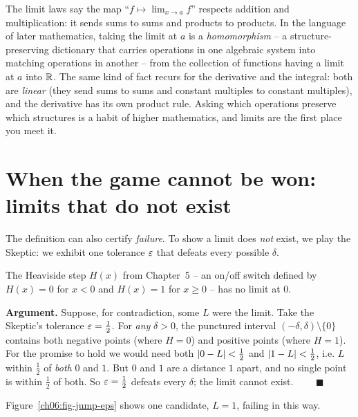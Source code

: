 \begin{connectionbox}
The limit laws say the map ``$f \mapsto \lim_{x\to a}f$'' respects addition and
multiplication: it sends sums to sums and products to products. In the language
of later mathematics, taking the limit at $a$ is a \emph{homomorphism} -- a
structure-preserving dictionary that carries operations in one algebraic system
into matching operations in another -- from the collection of functions having a
limit at $a$ into $\mathbb{R}$. The same kind of fact recurs for the derivative and the
integral: both are \emph{linear} (they send sums to sums and constant multiples
to constant multiples), and the derivative has its own product rule. Asking
which operations preserve which structures is a habit of higher mathematics,
and limits are the first place you meet it.
\end{connectionbox}

\section{When the game cannot be won: limits that do not exist}
\label{ch06:no-limit}

The definition can also certify \emph{failure}. To show a
limit does \emph{not} exist, we play the Skeptic: we exhibit one tolerance $\varepsilon$
that defeats every possible $\delta$.

\begin{example}[A jump]
\label{ch06:ex-jump}
The Heaviside step $H(x)$ from Chapter~5 -- an on/off switch defined by $H(x)=0$ for
$x<0$ and $H(x)=1$ for $x\ge 0$ -- has no limit at $0$.
\end{example}

\textbf{Argument.} Suppose, for contradiction, some $L$ were the limit. Take the
Skeptic's tolerance $\varepsilon=\tfrac12$. For \emph{any} $\delta>0$, the punctured
interval $(-\delta,\delta)\setminus\{0\}$ contains both negative points (where
$H=0$) and positive points (where $H=1$). For the promise to hold we would need
both $\lvert0-L\rvert<\tfrac12$ and $\lvert1-L\rvert<\tfrac12$, i.e. $L$ within $\tfrac12$ of
\emph{both} $0$ and $1$. But $0$ and $1$ are a distance $1$ apart, and no single
point is within $\tfrac12$ of both. So $\varepsilon=\tfrac12$ defeats every $\delta$;
the limit cannot exist. $\qquad\blacksquare$

Figure~\ref{ch06:fig-jump-eps} shows one candidate, $L=1$, failing in this way.

